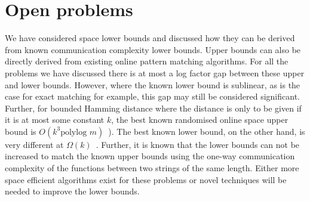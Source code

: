 \documentclass{article}
\theoremstyle{plain}
\theoremstyle{definition}
\begin{document}
\section{Open problems}

We have considered space lower bounds and discussed how they can be derived from known communication complexity lower bounds.  Upper bounds can also be directly derived from existing online pattern matching algorithms.  For all the problems we have discussed there is at most a log factor gap between these upper and lower bounds.  However, where the known lower bound is sublinear, as is the case for exact matching for example, this gap may still be considered significant. Further, for bounded Hamming distance where the distance is only to be given if it is at most some constant $k$, the best known randomised online space upper bound is $O(k^3 \text{polylog }{m})$~\cite{Porat:09}).  The best known lower bound, on the other hand, is very different at $\Omega(k)$~\cite{HSZZ:06}.  Further, it is known that the lower bounds can not be increased to match the known upper bounds using the one-way communication complexity of the functions between two strings of the same length. Either more space efficient algorithms exist for these problems or novel techniques will be needed to improve the lower bounds.



\end{document}
